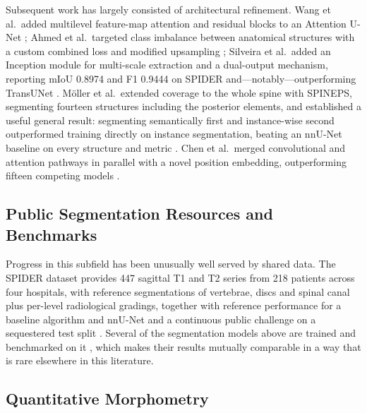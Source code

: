 Subsequent work has largely consisted of architectural refinement. Wang et al.\
added multilevel feature-map attention and residual blocks to an Attention U-Net
\cite{wang2022automatic}; Ahmed et al.\ targeted class imbalance between
anatomical structures with a custom combined loss and modified upsampling
\cite{ahmed2024pioneering}; Silveira et al.\ added an Inception module for
multi-scale extraction and a dual-output mechanism, reporting mIoU 0.8974 and
F1 0.9444 on SPIDER and---notably---outperforming TransUNet
\cite{silveira2025automated}. M\"oller et al.\ extended coverage to the whole
spine with SPINEPS, segmenting fourteen structures including the posterior
elements, and established a useful general result: segmenting semantically first
and instance-wise second outperformed training directly on instance segmentation,
beating an nnU-Net baseline \cite{isensee2021nnunet} on every structure and metric
\cite{mller2025spinepsautomatic}. Chen et al.\ merged convolutional and attention
pathways in parallel with a novel position embedding, outperforming fifteen
competing models \cite{chen2024symtc}.

\subsection{Public Segmentation Resources and Benchmarks}
\label{sec:lr-segmentation-data}

Progress in this subfield has been unusually well served by shared data. The
SPIDER dataset provides 447 sagittal T1 and T2 series from 218 patients across
four hospitals, with reference segmentations of vertebrae, discs and spinal
canal plus per-level radiological gradings, together with reference performance
for a baseline algorithm and nnU-Net and a continuous public challenge on a
sequestered test split \cite{vandergraaf2024lumbar}. Several of the segmentation
models above are trained and benchmarked on it
\cite{ahmed2024pioneering,silveira2025automated,patil2026mribased}, which makes
their results mutually comparable in a way that is rare elsewhere in this
literature.

\subsection{Quantitative Morphometry}
\label{sec:lr-morphometry}

